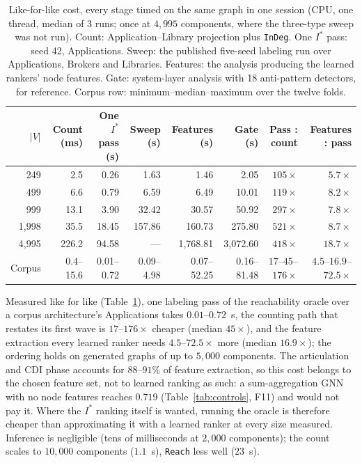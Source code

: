 \begin{table}[htbp]
\centering
\footnotesize
\setlength{\tabcolsep}{3pt}
\caption{Like-for-like cost, every stage timed on the same graph in one session (CPU, one thread, median of 3 runs; once at $4{,}995$ components, where the three-type sweep was not run). Count: Application--Library projection plus \texttt{InDeg}. One $I^*$ pass: seed 42, Applications. Sweep: the published five-seed labeling run over Applications, Brokers and Libraries. Features: the analysis producing the learned rankers' node features. Gate: system-layer analysis with 18 anti-pattern detectors, for reference. Corpus row: minimum--median--maximum over the twelve folds.}
\label{tab:cost-ll}
\begin{tabular}{rrrrrrrr}
\toprule
$|V|$ & Count (ms) & One $I^*$ pass (s) & Sweep (s) & Features (s) & Gate (s) & Pass : count & Features : pass \\
\midrule
249 & 2.5 & 0.26 & 1.63 & 1.46 & 2.05 & $105\times$ & $5.7\times$ \\
499 & 6.6 & 0.79 & 6.59 & 6.49 & 10.01 & $119\times$ & $8.2\times$ \\
999 & 13.1 & 3.90 & 32.42 & 30.57 & 50.92 & $297\times$ & $7.8\times$ \\
1{,}998 & 35.5 & 18.45 & 157.86 & 160.73 & 275.80 & $521\times$ & $8.7\times$ \\
4{,}995 & 226.2 & 94.58 & --- & 1{,}768.81 & 3{,}072.60 & $418\times$ & $18.7\times$ \\
\midrule
Corpus & 0.4--15.6 & 0.01--0.72 & 0.09--4.98 & 0.07--52.25 & 0.16--81.48 & $17$--$45$--$176\times$ & $4.5$--$16.9$--$72.5\times$ \\
\bottomrule
\end{tabular}
\end{table}

Measured like for like (Table~\ref{tab:cost-ll}), one labeling pass of the reachability oracle over a corpus architecture's Applications takes $0.01$--$0.72$~s, the counting path that restates its first wave is $17$--$176\times$ cheaper (median $45\times$), and the feature extraction every learned ranker needs $4.5$--$72.5\times$ more (median $16.9\times$); the ordering holds on generated graphs of up to $5{,}000$ components. The articulation and CDI phase accounts for $88$--$91\%$ of feature extraction, so this cost belongs to the chosen feature set, not to learned ranking as such: a sum-aggregation GNN with no node features reaches $0.719$ (Table~\ref{tab:controls}, F11) and would not pay it. Where the $I^*$ ranking itself is wanted, running the oracle is therefore cheaper than approximating it with a learned ranker at every size measured. Inference is negligible (tens of milliseconds at $2{,}000$ components); the count scales to $10{,}000$ components ($1.1$~s), \texttt{Reach} less well ($23$~s).

